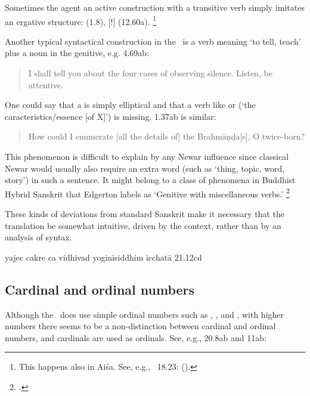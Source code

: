 Sometimes the agent an active construction with a transitive verb
simply imitates an ergative structure:  (1.8),
[!]  (12.60a).%
		\footnote{This happens also in Aiśa. See, e.g., \SiddhYogMata\ 18.23: 
		 ().}

Another typical syntactical construction in the \VSS\ is a verb
meaning `to tell, teach' plus a noun in the genitive, e.g. 4.69ab:

\begin{quote}

        I shall tell you about the four cases of observing silence. 
        Listen, be attentive.
\end{quote}

\noindent
One could say that  a is simply elliptical and that
a verb like  or  
(`the caracteristics/essence [of X]') is missing. 1.37ab is similar:

\begin{quote}

How could I enumerate [all the details of] the Brahmāṇḍa[s], O twice-born?
\end{quote}

\noindent
This phenomenon is difficult to explain by any Newar influence since
classical Newar would usually also require an 
extra word (such as  `thing, topic, word, story') in such a sentence.
It might belong to a class of phenomena in Buddhist Hybrid Sanskrit 
that Edgerton labels as `Genitive with miscellaneous verbs.'%
		\footnote{.}

These kinds of deviations from standard Sanskrit make it
necessary that the translation be somewhat intuitive,
driven by the context, rather than by an analysis of syntax.




yajec cakre ca vidhivad yoginīsiddhim icchatā 21.12cd


\subsection{Cardinal and ordinal numbers}

Although the \VSS\ does use simple ordinal numbers such 
as , , and , with higher 
numbers there seems to be a non-distinction between cardinal
and ordinal numbers, and cardinals are used as ordinals.
See, e.g., 20.8ab and 11ab:

